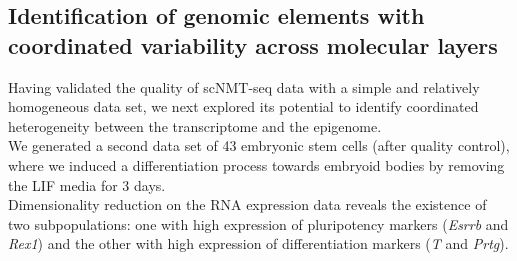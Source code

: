 


\subsection{Identification of genomic elements with coordinated variability across molecular layers}

Having validated the quality of scNMT-seq data with a simple and relatively homogeneous data set, we next explored its potential to identify coordinated heterogeneity between the transcriptome and the epigenome.\\
We generated a second data set of 43 embryonic stem cells (after quality control), where we induced a differentiation process towards embryoid bodies by removing the LIF media for 3 days.\\Dimensionality reduction on the RNA expression data reveals the existence of two subpopulations: one with high expression of pluripotency markers (\textit{Esrrb} and \textit{Rex1}) and the other with high expression of differentiation markers (\textit{T} and \textit{Prtg}).



